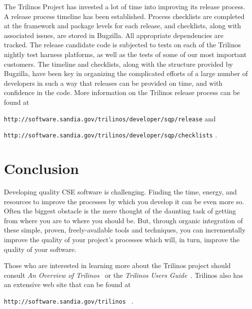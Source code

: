 \documentclass[12pt,relax]{article}
\newcommand{\InlineDirectory}[1]{
  {\hspace{0.01 in}} {\tt #1} {\hspace{0.01 in}}}
\begin{document}
The Trilinos Project has invested a lot of time into improving its release
process.  A release process timeline has been established.  Process 
checklists are completed at the framework and package levels for each release,
and checklists, along with associated issues, are stored in Bugzilla.  All
appropriate dependencies are tracked.  The release candidate code is subjected
to tests on each of the Trilinos nightly test harness platforms, as well as the
tests of some of our most important customers.  The timeline and checklists,
along with the structure provided by Bugzilla, have been key in organizing the
complicated efforts of a large number of developers in such a way that releases
can be provided on time, and with confidence in the code.  More information on
the Trilinos release process can be found at \newline
\InlineDirectory{http://software.sandia.gov/trilinos/developer/sqp/release} 
and \newline
\InlineDirectory{http://software.sandia.gov/trilinos/developer/sqp/checklists}.



\section{Conclusion}
\label{Section:Conclusion}

Developing quality CSE software is challenging.  Finding the time, energy, and
resources to improve the processes by which you develop it can be even more so.
Often the biggest obstacle is the mere thought of the daunting task of getting
from where you are to where you should be.  But, through organic integration of
these simple, proven, freely-available tools and techniques, you can
incrementally improve the quality of your project's processes which will, in
turn, improve the quality of your software.

\clearpage


Those who are interested in learning more about the Trilinos project should 
consult {\it An Overview of Trilinos}~\cite{Trilinos-Overview} or the
{\it Trilinos Users Guide}~\cite{Trilinos-Users-Guide}.  Trilinos also has an 
extensive web site that can be found at \newline
\InlineDirectory{http://software.sandia.gov/trilinos}~\cite{Trilinos-home-page}.

\clearpage



%

\end{document}
